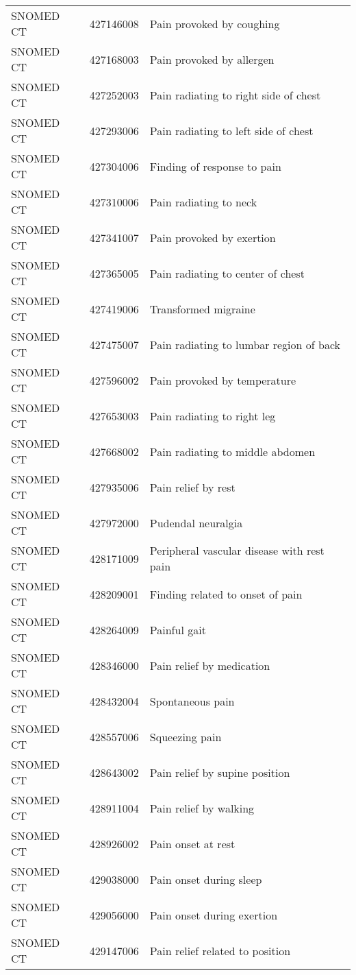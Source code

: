\begin{longtable}{p{}p{}p{}}
  SNOMED CT & 427146008 & Pain provoked by coughing \\ 
  SNOMED CT & 427168003 & Pain provoked by allergen \\ 
  SNOMED CT & 427252003 & Pain radiating to right side of chest \\ 
  SNOMED CT & 427293006 & Pain radiating to left side of chest \\ 
  SNOMED CT & 427304006 & Finding of response to pain \\ 
  SNOMED CT & 427310006 & Pain radiating to neck \\ 
  SNOMED CT & 427341007 & Pain provoked by exertion \\ 
  SNOMED CT & 427365005 & Pain radiating to center of chest \\ 
  SNOMED CT & 427419006 & Transformed migraine \\ 
  SNOMED CT & 427475007 & Pain radiating to lumbar region of back \\ 
  SNOMED CT & 427596002 & Pain provoked by temperature \\ 
  SNOMED CT & 427653003 & Pain radiating to right leg \\ 
  SNOMED CT & 427668002 & Pain radiating to middle abdomen \\ 
  SNOMED CT & 427935006 & Pain relief by rest \\ 
  SNOMED CT & 427972000 & Pudendal neuralgia \\ 
  SNOMED CT & 428171009 & Peripheral vascular disease with rest pain \\ 
  SNOMED CT & 428209001 & Finding related to onset of pain \\ 
  SNOMED CT & 428264009 & Painful gait \\ 
  SNOMED CT & 428346000 & Pain relief by medication \\ 
  SNOMED CT & 428432004 & Spontaneous pain \\ 
  SNOMED CT & 428557006 & Squeezing pain \\ 
  SNOMED CT & 428643002 & Pain relief by supine position \\ 
  SNOMED CT & 428911004 & Pain relief by walking \\ 
  SNOMED CT & 428926002 & Pain onset at rest \\ 
  SNOMED CT & 429038000 & Pain onset during sleep \\ 
  SNOMED CT & 429056000 & Pain onset during exertion \\ 
  SNOMED CT & 429147006 & Pain relief related to position \\ 

\end{longtable}

